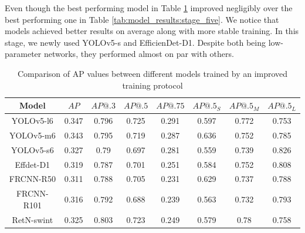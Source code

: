Even though the best performing model in Table \ref{tab:improved:precision} improved negligibly over the best performing one in Table \ref{tab:model_results:stage_five}. We notice that models achieved better results on average along with more stable training. In this stage, we newly used YOLOv5-s and EfficienDet-D1. Despite both being low-parameter networks, they performed almost on par with others.
\begin{table}[H]
    \centering
    \begin{tabular}{|c|c|c|c|c|c|c|c|}
        \hline
        Model      & $AP$  & $AP@.3$ & $AP@.5$ & $AP@.75$ & $AP@.5_S$ & $AP@.5_M$ & $AP@.5_L$ \\ \hline
        YOLOv5-l6  & 0.347 & 0.796   & 0.725   & 0.291    & 0.597     & 0.772     & 0.753     \\ \hline
        YOLOv5-m6  & 0.343 & 0.795   & 0.719   & 0.287    & 0.636     & 0.752     & 0.785     \\ \hline
        YOLOv5-s6  & 0.327 & 0.79    & 0.697   & 0.281    & 0.559     & 0.739     & 0.826     \\ \hline
        Effdet-D1  & 0.319 & 0.787   & 0.701   & 0.251    & 0.584     & 0.752     & 0.808     \\ \hline
        FRCNN-R50  & 0.311 & 0.788   & 0.705   & 0.231    & 0.629     & 0.737     & 0.788     \\ \hline
        FRCNN-R101 & 0.316 & 0.792   & 0.688   & 0.239    & 0.563     & 0.732     & 0.793     \\ \hline
        RetN-swint & 0.325 & 0.803   & 0.723   & 0.249    & 0.579     & 0.78      & 0.758     \\ \hline
    \end{tabular}
    \caption{Comparison of AP values between different models trained by an improved training protocol}
    \label{tab:improved:precision}
\end{table}



